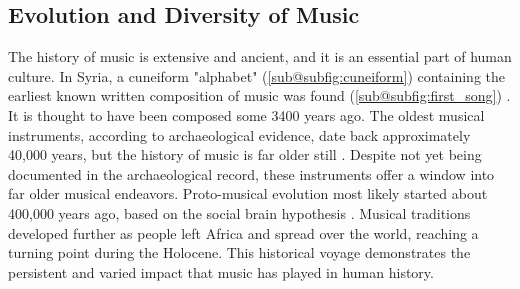 \subsection{Evolution and Diversity of Music}
\begin{figure}[!ht]
    \centering
    \qquad
\end{figure}
The history of music is extensive and ancient, and it is an essential part of human culture. 
In Syria, a cuneiform "alphabet" (\ref{sub@subfig:cuneiform}) containing the earliest known written composition of music was found (\ref{sub@subfig:first_song}) \cite{porter_2018_did}.
It is thought to have been composed some 3400 years ago. 
The oldest musical instruments, according to archaeological evidence, date back approximately 40,000 years, but the history of music is far older still \cite{killin_2018_the}.
Despite not yet being documented in the archaeological record, these instruments offer a window into far older musical endeavors. 
Proto-musical evolution most likely started about 400,000 years ago, based on the social brain hypothesis \cite{dunbar_social_brain}. 
Musical traditions developed further as people left Africa and spread over the world, reaching a turning point during the Holocene. 
This historical voyage demonstrates the persistent and varied impact that music has played in human history.
